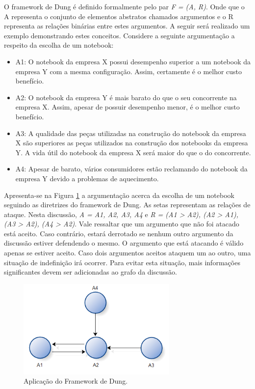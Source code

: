 O framework de Dung é definido formalmente pelo par \textit{F = (A, R)}. Onde que o A representa o conjunto de elementos abstratos chamados argumentos e o R representa as relações binárias entre estes argumentos. A seguir será realizado um exemplo demonstrando estes conceitos. Considere a seguinte argumentação a respeito da escolha de um notebook:

\begin{itemize}

\item A1: O notebook da empresa X possui desempenho superior a um notebook da empresa Y com a mesma configuração. Assim, certamente é o melhor custo benefício.

\item A2: O notebook da empresa Y é mais barato do que o seu concorrente na empresa X. Assim, apesar de possuir desempenho menor, é o melhor custo benefício.

\item A3: A qualidade das peças utilizadas na construção do notebook da empresa X são superiores as peças utilizados na construção dos notebooks da empresa Y. A vida útil do notebook da empresa X será maior do que o do concorrente. 

\item A4: Apesar de barato, vários consumidores estão reclamando do notebook da empresa Y devido a problemas de aquecimento.

\end{itemize}

Apresenta-se na Figura \ref{aplicacao_framework_dung} a argumentação acerca da escolha de um notebook seguindo as diretrizes do framework de Dung. As setas representam as relações de ataque. Nesta discussão, \textit{A = {A1, A2, A3, A4}} e \textit{R = {(A1 > A2), (A2 > A1), (A3 > A2), (A4 > A2)}}. Vale ressaltar que um argumento que não foi atacado está aceito. Caso contrário, estará derrotado se nenhum outro argumento da discussão estiver defendendo o mesmo. O argumento que está atacando é válido apenas se estiver aceito. Caso dois argumentos aceitos ataquem um ao outro, uma situação de indefinição irá ocorrer. Para evitar esta situação, mais informações significantes devem ser adicionadas ao grafo da discussão.

\graphicspath{{figuras/}}
\begin{figure}[H]
\centering
\includegraphics[width=0.7\textwidth]{aplicacao_framework_dung}
\caption{Aplicação do Framework de Dung.} 
\label{aplicacao_framework_dung}
\end{figure}


